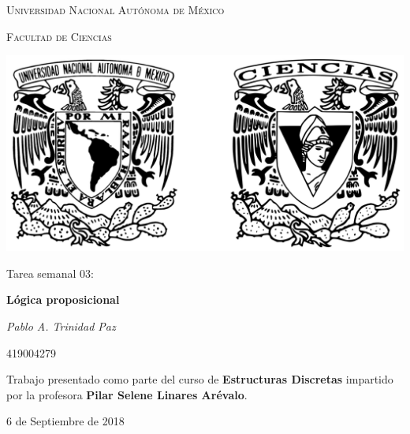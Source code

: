 \documentclass[10pt,letterpaper]{article}
\begin{document}
\begin{titlepage}
    \centering

    {\scshape\LARGE Universidad Nacional Autónoma de México \par}

    \vspace{1cm}
    {\scshape\Large Facultad de Ciencias\par}
    \vspace{1.5cm}

    \begin{center}
        \includegraphics[scale=.1]{../../assets/img/logo.png}
    \end{center}

    \vspace{.8 cm}

    {\LARGE Tarea semanal 03: \par}
    {\huge\bfseries Lógica proposicional \par}

    \vspace{0.5cm}
    {\large\itshape Pablo A. Trinidad Paz\par}
    419004279

    \vfill

    Trabajo presentado como parte del curso de \textbf{Estructuras Discretas}
    impartido por la profesora \textbf{Pilar Selene Linares Arévalo}. \par
    \vspace{0.1cm}
    {\large 6 de Septiembre de 2018\par}
\end{titlepage}
\end{document}
